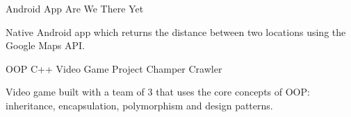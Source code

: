 \begin{cventries}
  \cventry
    {Android App}
    {Are We There Yet}
    {}
    {}
    {
      \begin{cvitems}
        \item {Native Android app which returns the distance between two locations using the Google Maps API.}
      \end{cvitems}
    }
  \cventry
    {OOP C++ Video Game Project}
    {Champer Crawler}
    {}
    {}
    {
      \begin{cvitems}
        \item {Video game built with a team of 3 that uses the core concepts of OOP: inheritance, encapsulation, polymorphism and design patterns.}
      \end{cvitems}
    }
\end{cventries}
